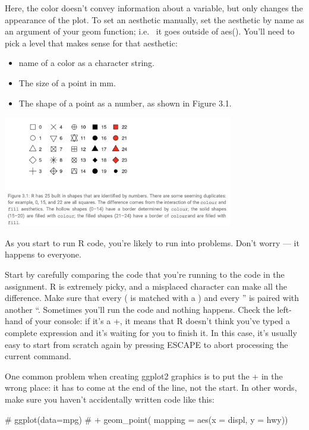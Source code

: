 \documentclass[
  letterpaper,
  DIV=11,
  numbers=noendperiod]{scrreprt}
\newenvironment{Shaded}{\begin{snugshade}}{\end{snugshade}}
\newcommand{\CommentTok}[1]{\textcolor[rgb]{0.37,0.37,0.37}{#1}}
\providecommand{\tightlist}{%
  \setlength{\itemsep}{0pt}\setlength{\parskip}{0pt}}\usepackage{longtable,booktabs,array}
\begin{document}
Here, the color doesn't convey information about a variable, but only
changes the appearance of the plot. To set an aesthetic manually, set
the aesthetic by name as an argument of your geom function; i.e.~ it
goes outside of aes(). You'll need to pick a level that makes sense for
that aesthetic:

\begin{itemize}
\tightlist
\item
  name of a color as a character string.
\item
  The size of a point in mm.
\item
  The shape of a point as a number, as shown in Figure 3.1.
\end{itemize}

\includegraphics[width=0.75\textwidth,height=\textheight]{./images/Daily-2-Pic-5.jpg}

As you start to run R code, you're likely to run into problems. Don't
worry --- it happens to everyone.

Start by carefully comparing the code that you're running to the code in
the assignment. R is extremely picky, and a misplaced character can make
all the difference. Make sure that every ( is matched with a ) and every
'' is paired with another ``. Sometimes you'll run the code and nothing
happens. Check the left-hand of your console: if it's a +, it means that
R doesn't think you've typed a complete expression and it's waiting for
you to finish it. In this case, it's usually easy to start from scratch
again by pressing ESCAPE to abort processing the current command.

One common problem when creating ggplot2 graphics is to put the + in the
wrong place: it has to come at the end of the line, not the start. In
other words, make sure you haven't accidentally written code like this:

\begin{Shaded}
\begin{Highlighting}[]
\CommentTok{\# ggplot(data=mpg)}
\CommentTok{\# + geom\_point( mapping = aes(x = displ, y = hwy))}
\end{Highlighting}
\end{Shaded}
\end{document}
